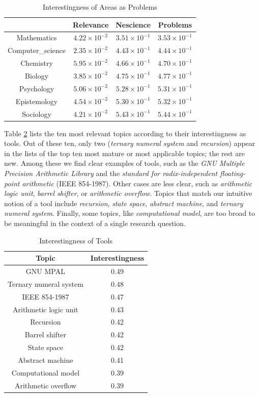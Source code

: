 \begin{table}
\begin{centering}
\begin{tabular}{|c|c|c|c|}
\hline 
 & Relevance & Nescience & Problems\tabularnewline
\hline 
\hline 
Mathematics & $4.22\times10^{-2}$ & $3.51\times10^{-1}$ & $3.53\times10^{-1}$\tabularnewline
\hline 
Computer\_science & $2.35\times10^{-2}$ & $4.43\times10^{-1}$ & $4.44\times10^{-1}$\tabularnewline
\hline 
Chemistry & $5.95\times10^{-2}$ & $4.66\times10^{-1}$ & $4.70\times10^{-1}$\tabularnewline
\hline 
Biology & $3.85\times10^{-2}$ & $4.75\times10^{-1}$ & $4.77\times10^{-1}$\tabularnewline
\hline 
Psychology & $5.06\times10^{-2}$ & $5.28\times10^{-1}$ & $5.31\times10^{-1}$\tabularnewline
\hline 
Epistemology & $4.54\times10^{-2}$ & $5.30\times10^{-1}$ & $5.32\times10^{-1}$\tabularnewline
\hline 
Sociology & $4.21\times10^{-2}$ & $5.43\times10^{-1}$ & $5.44\times10^{-1}$\tabularnewline
\hline 
\end{tabular}
\par\end{centering}

\caption{\label{tab:Interestingness-of-Areas-as-Problems}Interestingness of Areas as Problems}
\end{table}

Table \ref{tab:Interestingness-of-Tools} lists the ten most relevant topics according to their interestingness as tools. Out of these ten, only two (\emph{ternary numeral system} and \emph{recursion}) appear in the lists of the top ten most mature or most applicable topics; the rest are new. Among these we find clear examples of tools, such as the \emph{GNU Multiple Precision Arithmetic Library} and the \emph{standard for radix-independent floating-point arithmetic} (IEEE 854-1987). Other cases are less clear, such as \emph{arithmetic logic unit}, \emph{barrel shifter}, or \emph{arithmetic overflow}. Topics that match our intuitive notion of a tool include \emph{recursion}, \emph{state space}, \emph{abstract machine}, and \emph{ternary numeral system}. Finally, some topics, like \emph{computational model}, are too broad to be meaningful in the context of a single research question.

\begin{table}
\begin{centering}
\begin{tabular}{|c|c|}
\hline 
Topic & Interestingness\tabularnewline
\hline 
\hline 
GNU MPAL & 0.49\tabularnewline
\hline 
Ternary numeral system & 0.48\tabularnewline
\hline 
IEEE 854-1987 & 0.47\tabularnewline
\hline 
Arithmetic logic unit & 0.43\tabularnewline
\hline 
Recursion & 0.42\tabularnewline
\hline 
Barrel shifter & 0.42\tabularnewline
\hline 
State space & 0.42\tabularnewline
\hline 
Abstract machine & 0.41\tabularnewline
\hline 
Computational model & 0.39\tabularnewline
\hline 
Arithmetic overflow & 0.39\tabularnewline
\hline 
\end{tabular}
\par\end{centering}

\caption{\label{tab:Interestingness-of-Tools}Interestingness of Tools}
\end{table}

